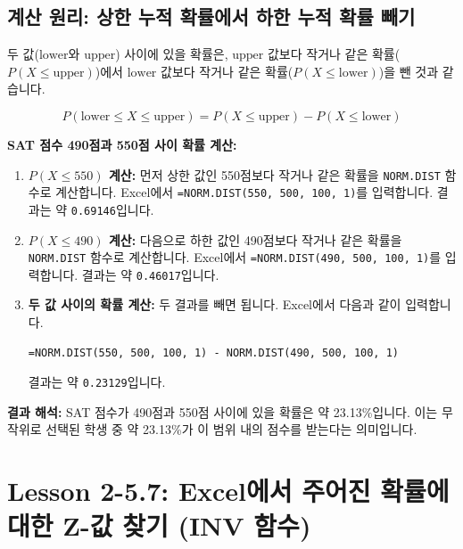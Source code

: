 \documentclass[11pt,a4paper]{article}
\begin{document}
\subsection{계산 원리: 상한 누적 확률에서 하한 누적 확률 빼기}
두 값($\text{lower}$와 $\text{upper}$) 사이에 있을 확률은, $\text{upper}$ 값보다 작거나 같은 확률($P(X \le \text{upper})$)에서 $\text{lower}$ 값보다 작거나 같은 확률($P(X \le \text{lower})$)을 뺀 것과 같습니다.

\begin{equation*}
    P(\text{lower} \le X \le \text{upper}) = P(X \le \text{upper}) - P(X \le \text{lower})
\end{equation*}

\begin{examplebox}
    \textbf{SAT 점수 490점과 550점 사이 확률 계산:}
    \begin{enumerate}
        \item \textbf{$P(X \le 550)$ 계산:}
        먼저 상한 값인 550점보다 작거나 같은 확률을 \texttt{NORM.DIST} 함수로 계산합니다.
        Excel에서 \texttt{=NORM.DIST(550, 500, 100, 1)}를 입력합니다.
        결과는 약 \texttt{0.69146}입니다.

        \item \textbf{$P(X \le 490)$ 계산:}
        다음으로 하한 값인 490점보다 작거나 같은 확률을 \texttt{NORM.DIST} 함수로 계산합니다.
        Excel에서 \texttt{=NORM.DIST(490, 500, 100, 1)}를 입력합니다.
        결과는 약 \texttt{0.46017}입니다.

        \item \textbf{두 값 사이의 확률 계산:}
        두 결과를 빼면 됩니다. Excel에서 다음과 같이 입력합니다.
        \begin{lstlisting}[language=Excel, caption={Excel에서 '두 값 사이' 확률 계산 예시}, label={lst:norm_dist_between_values}]
=NORM.DIST(550, 500, 100, 1) - NORM.DIST(490, 500, 100, 1)
        \end{lstlisting}
        결과는 약 \texttt{0.23129}입니다.
    \end{enumerate}

    \textbf{결과 해석:}
    SAT 점수가 490점과 550점 사이에 있을 확률은 약 23.13\%입니다.
    이는 무작위로 선택된 학생 중 약 23.13\%가 이 범위 내의 점수를 받는다는 의미입니다.
\end{examplebox}

\newpage
\section{Lesson 2-5.7: Excel에서 주어진 확률에 대한 Z-값 찾기 (INV 함수)}
\end{document}
